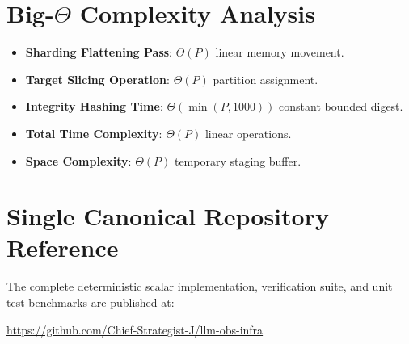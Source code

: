 \documentclass[11pt,a4paper]{article}
\theoremstyle{definition}
\begin{document}
\section{Big-$\Theta$ Complexity Analysis}

\begin{itemize}
    \item \textbf{Sharding Flattening Pass}: $\Theta(P)$ linear memory movement.
    \item \textbf{Target Slicing Operation}: $\Theta(P)$ partition assignment.
    \item \textbf{Integrity Hashing Time}: $\Theta(\min(P, 1000))$ constant bounded digest.
    \item \textbf{Total Time Complexity}: $\Theta(P)$ linear operations.
    \item \textbf{Space Complexity}: $\Theta(P)$ temporary staging buffer.
\end{itemize}

\section{Single Canonical Repository Reference}

The complete deterministic scalar implementation, verification suite, and unit test benchmarks are published at:
\begin{center}
\url{https://github.com/Chief-Strategist-J/llm-obs-infra}
\end{center}
\end{document}
